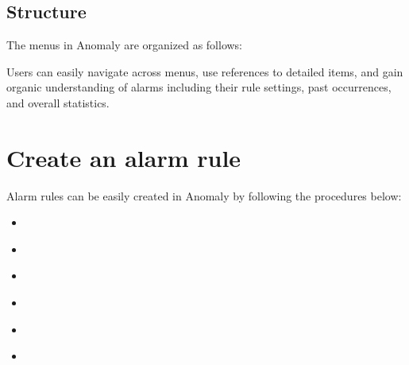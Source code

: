 \documentclass[letterpaper,10pt,english]{sphinxmanual}
\begin{document}
\section{Structure}
\label{\detokenize{anomaly/part01/index:id3}}
The menus in Anomaly are organized as follows:
\begin{quote}

\begin{figure}[H]
\centering

\noindent{}
\end{figure}
\end{quote}

Users can easily navigate across menus, use references to detailed items, and gain organic understanding of alarms including their rule settings, past occurrences, and overall statistics.


\chapter{Create an alarm rule}
\label{\detokenize{anomaly/part02/index:id1}}\label{\detokenize{anomaly/part02/index::doc}}
Alarm rules can be easily created in Anomaly by following the procedures below:
\begin{itemize}
\item {} 
{\hyperref[\detokenize{anomaly/part02/index:select-datasource}]{}}

\item {} 
{\hyperref[\detokenize{anomaly/part02/index:select-columns}]{}}

\item {} 
{\hyperref[\detokenize{anomaly/part02/index:configure-training}]{}}

\item {} 
{\hyperref[\detokenize{anomaly/part02/index:select-model}]{}}

\item {} 
{\hyperref[\detokenize{anomaly/part02/index:alarm-rule-settings}]{}}

\item {} 
{\hyperref[\detokenize{anomaly/part02/index:complete-rule}]{}}

\end{itemize}
\end{document}
